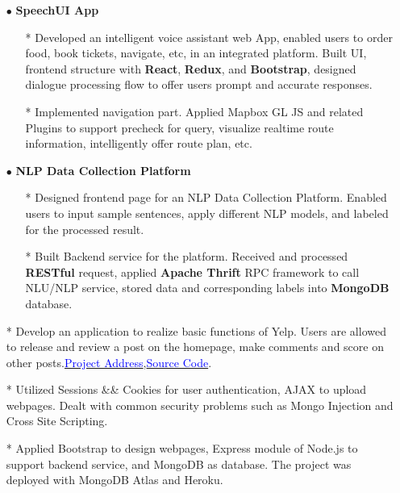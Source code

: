 \documentclass[10pt,letterpaper,sans]{moderncv} %
\begin{document}
\begin{itemize}
\item[$\bullet$] \textbf{SpeechUI App}
\begin{itemize}
\item[*] Developed an intelligent voice assistant web App, enabled users to order food, book tickets, navigate, etc, in an integrated platform. Built UI, frontend structure with \textbf{React}, \textbf{Redux}, and \textbf{Bootstrap}, designed dialogue processing flow to offer users prompt and accurate responses.
\item[*] Implemented navigation part. Applied Mapbox GL JS and related Plugins to support precheck for query, visualize realtime route information, intelligently offer route plan, etc.
\end{itemize}
\item[$\bullet$] \textbf{NLP Data Collection Platform}
\begin{itemize}
\item[*] Designed frontend page for an NLP Data Collection Platform. Enabled users to input sample sentences, apply different NLP models, and labeled for the processed result.
\item[*] Built Backend service for the platform. Received and processed \textbf{RESTful} request, applied \textbf{Apache Thrift} RPC framework to call NLU/NLP service, stored data and corresponding labels into \textbf{MongoDB} database. 
\end{itemize}
\end{itemize}

\begin{itemize}
\item[*] Develop an application to realize basic functions of Yelp. Users are allowed to release and review a post on the homepage, make comments and score on other posts.\href{https://morning-sea-07913.herokuapp.com/}{\textcolor{blue}{Project Address}},\href{https://github.com/ChrisD12138/Yelpcamp}{\textcolor{blue}{Source Code}}.
\item[*] Utilized Sessions \&\& Cookies for user authentication, AJAX to upload webpages. Dealt with common security problems such as Mongo Injection and Cross Site Scripting. 
\item[*] Applied Bootstrap to design webpages, Express module of Node.js to support backend service, and MongoDB as database. The project was deployed with MongoDB Atlas and Heroku.
\end{itemize}
\end{document}
